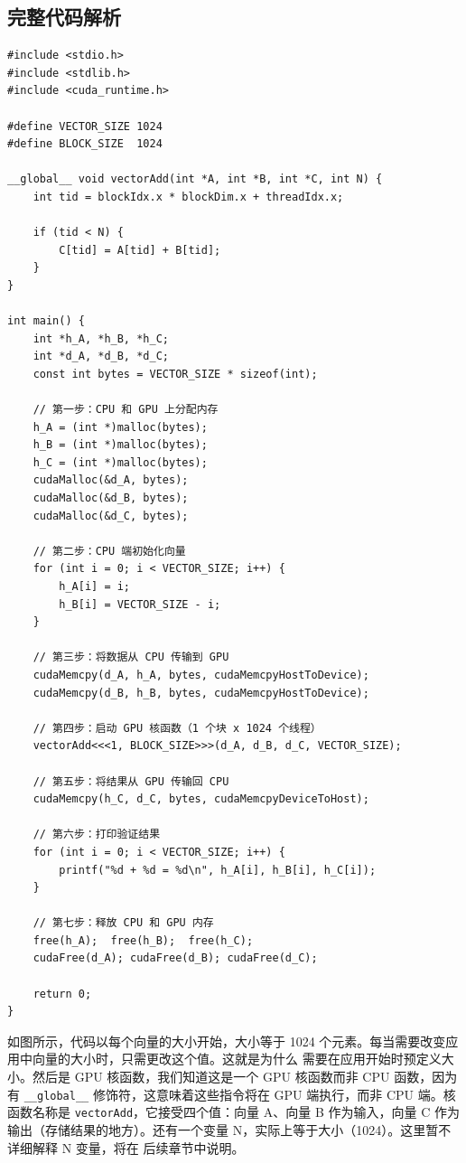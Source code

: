 \subsection{完整代码解析}

\begin{lstlisting}[caption={向量加法完整CUDA程序}]
#include <stdio.h>
#include <stdlib.h>
#include <cuda_runtime.h>

#define VECTOR_SIZE 1024
#define BLOCK_SIZE  1024

__global__ void vectorAdd(int *A, int *B, int *C, int N) {
    int tid = blockIdx.x * blockDim.x + threadIdx.x;

    if (tid < N) {
        C[tid] = A[tid] + B[tid];
    }
}

int main() {
    int *h_A, *h_B, *h_C;
    int *d_A, *d_B, *d_C;
    const int bytes = VECTOR_SIZE * sizeof(int);

    // 第一步：CPU 和 GPU 上分配内存
    h_A = (int *)malloc(bytes);
    h_B = (int *)malloc(bytes);
    h_C = (int *)malloc(bytes);
    cudaMalloc(&d_A, bytes);
    cudaMalloc(&d_B, bytes);
    cudaMalloc(&d_C, bytes);

    // 第二步：CPU 端初始化向量
    for (int i = 0; i < VECTOR_SIZE; i++) {
        h_A[i] = i;
        h_B[i] = VECTOR_SIZE - i;
    }

    // 第三步：将数据从 CPU 传输到 GPU
    cudaMemcpy(d_A, h_A, bytes, cudaMemcpyHostToDevice);
    cudaMemcpy(d_B, h_B, bytes, cudaMemcpyHostToDevice);

    // 第四步：启动 GPU 核函数（1 个块 x 1024 个线程）
    vectorAdd<<<1, BLOCK_SIZE>>>(d_A, d_B, d_C, VECTOR_SIZE);

    // 第五步：将结果从 GPU 传输回 CPU
    cudaMemcpy(h_C, d_C, bytes, cudaMemcpyDeviceToHost);

    // 第六步：打印验证结果
    for (int i = 0; i < VECTOR_SIZE; i++) {
        printf("%d + %d = %d\n", h_A[i], h_B[i], h_C[i]);
    }

    // 第七步：释放 CPU 和 GPU 内存
    free(h_A);  free(h_B);  free(h_C);
    cudaFree(d_A); cudaFree(d_B); cudaFree(d_C);

    return 0;
}
\end{lstlisting}

如图所示，代码以每个向量的大小开始，大小等于 1024 个元素。每当需要改变应用中向量的大小时，只需更改这个值。这就是为什么
需要在应用开始时预定义大小。然后是 GPU 核函数，我们知道这是一个 GPU 核函数而非 CPU 函数，因为有 \texttt{\_\_global\_\_} 
修饰符，这意味着这些指令将在 GPU 端执行，而非 CPU 端。核函数名称是 \texttt{vectorAdd}，它接受四个值：向量 A、向量 
B 作为输入，向量 C 作为输出（存储结果的地方）。还有一个变量 N，实际上等于大小（1024）。这里暂不详细解释 N 变量，将在
后续章节中说明。

